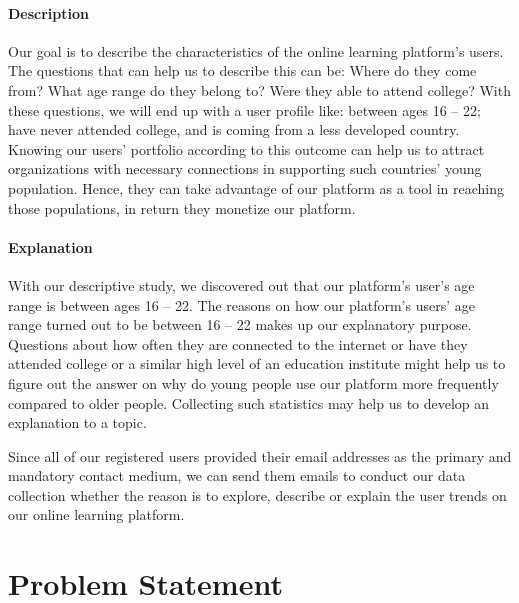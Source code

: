 \paragraph{Description}
Our goal is to describe the characteristics of the online learning platform's users. The questions that can help us to describe this can be: Where do they come from? What age range do they belong to? Were they able to attend college? With these questions, we will end up with a user profile like: between ages 16 -- 22; have never attended college, and is coming from a less developed country. Knowing our users' portfolio according to this outcome can help us to attract organizations with necessary connections in supporting such countries' young population. Hence, they can take advantage of our platform as a tool in reaching those populations, in return they monetize our platform.

\paragraph{Explanation}
With our descriptive study, we discovered out that our platform's user's age range is between ages 16 -- 22. The reasons on how our platform's users' age range turned out to be between 16 -- 22 makes up our explanatory purpose. Questions about how often they are connected to the internet or have they attended college or a similar high level of an education institute might help us to figure out the answer on why do young people use our platform more frequently compared to older people. Collecting such statistics may help us to develop an explanation to a topic.

\vspace{1cm}
Since all of our registered users provided their email addresses as the primary and mandatory contact medium, we can send them emails to conduct our data collection whether the reason is to explore, describe or explain the user trends on our online learning platform.

\section{Problem Statement}
\label{sec:2:Problem}

